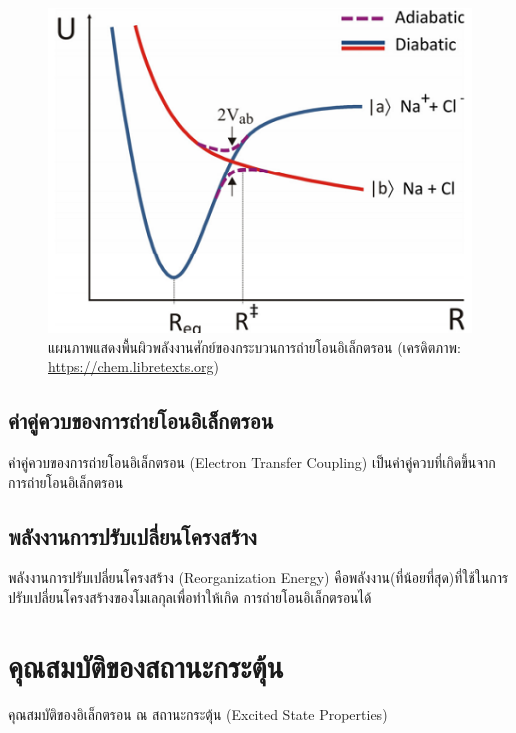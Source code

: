 \begin{figure}[H]
    \centering
    \includegraphics[width=0.7\linewidth]{fig/et_diagram.png}
    \caption{แผนภาพแสดงพื้นผิวพลังงานศักย์ของกระบวนการถ่ายโอนอิเล็กตรอน (เครดิตภาพ: \url{https://chem.libretexts.org})}
    \label{fig:et_diagram}
\end{figure}

\subsection{ค่าคู่ควบของการถ่ายโอนอิเล็กตรอน}
\label{ssec:et_coupling}

ค่าคู่ควบของการถ่ายโอนอิเล็กตรอน (Electron Transfer Coupling) เป็นค่าคู่ควบที่เกิดขึ้นจากการถ่ายโอนอิเล็กตรอน

\subsection{พลังงานการปรับเปลี่ยนโครงสร้าง}
\label{ssec:reor_ener}

พลังงานการปรับเปลี่ยนโครงสร้าง (Reorganization Energy) คือพลังงาน(ที่น้อยที่สุด)ที่ใช้ในการปรับเปลี่ยนโครงสร้างของโมเลกุลเพื่อทำให้เกิด%
การถ่ายโอนอิเล็กตรอนได้

\section{คุณสมบัติของสถานะกระตุ้น}
\label{sec:ex_prop}

คุณสมบัติของอิเล็กตรอน ณ สถานะกระตุ้น (Excited State Properties)

